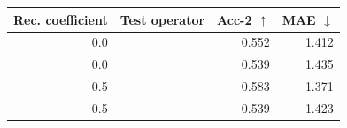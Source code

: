 \begin{tabular}{rlrr}
\toprule
Rec. coefficient & Test operator & Acc-2 $\uparrow$ & MAE $\downarrow$ \\
\midrule
0.0 & \tokenlevel{} & 0.552 & 1.412 \\
0.0 & \modlevel{} & 0.539 & 1.435 \\
0.5 & \tokenlevel{} & 0.583 & 1.371 \\
0.5 & \modlevel{} & 0.539 & 1.423 \\
\bottomrule
\end{tabular}
